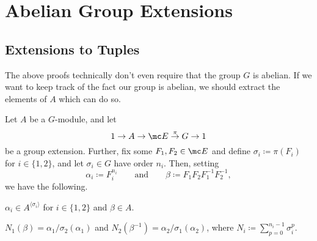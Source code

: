 \documentclass{article}
\numberwithin{equation}{section}
\begin{document}
\section{Abelian Group Extensions} \label{sec:abelian}

\subsection{Extensions to Tuples}
The above proofs technically don't even require that the group $ G$ is abelian. If we want to keep track of the fact our group is abelian, we should extract the elements of $A$ which can do so.
\begin{lemma} \label{lem:constructalphabeta}
	Let $A$ be a $ G$-module, and let 
	\[1\to A\to\mc E\stackrel\pi\to G\to1\]
	be a group extension. Further, fix some $F_1,F_2\in\mc E$ and define $\sigma_i\coloneqq\pi(F_i)$ for $i\in\{1,2\}$, and let $\sigma_i\in G$ have order $n_i$. Then, setting
	\[\alpha_i\coloneqq F_i^{n_i}\qquad\text{and}\qquad\beta\coloneqq F_1F_2F_1^{-1}F_2^{-1},\]
	we have the following.
	\begin{listalph}
		\item $\alpha_i\in A^{\langle\sigma_i\rangle}$ for $i\in\{1,2\}$ and $\beta\in A$.
		\item $N_1(\beta)=\alpha_1/\sigma_2(\alpha_1)$ and $N_2(\beta^{-1})=\alpha_2/\sigma_1(\alpha_2)$, where $N_i\coloneqq\sum_{p=0}^{n_i-1}\sigma_i^p$.
	\end{listalph}
\end{lemma}
\end{document}
